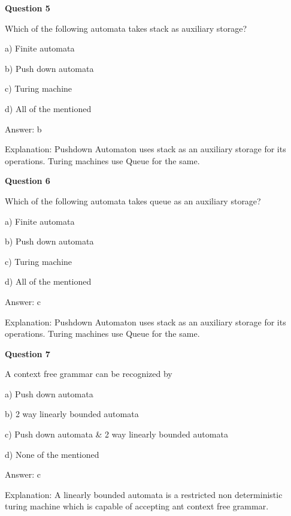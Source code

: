 \documentclass{article}
\begin{document}
\begin{mdframed}[linewidth=1pt, roundcorner=5pt, linecolor=gray!30, backgroundcolor=gray!5]
\textbf{Question 5} 

Which of the following automata takes stack as auxiliary storage?

a) Finite automata

b) Push down automata

c) Turing machine

d) All of the mentioned
\vspace{5pt} \par
\begin{tcolorbox}[colback=green!5, colframe=green!40!black, title=Solution]
Answer: b

Explanation: Pushdown Automaton uses stack as an auxiliary storage for its operations. Turing machines use Queue for the same.
\end{tcolorbox}
\end{mdframed}

\begin{mdframed}[linewidth=1pt, roundcorner=5pt, linecolor=gray!30, backgroundcolor=gray!5]
\textbf{Question 6} 

Which of the following automata takes queue as an auxiliary storage?

a) Finite automata

b) Push down automata

c) Turing machine

d) All of the mentioned
\vspace{5pt} \par
\begin{tcolorbox}[colback=green!5, colframe=green!40!black, title=Solution]
Answer: c

Explanation: Pushdown Automaton uses stack as an auxiliary storage for its operations. Turing machines use Queue for the same.
\end{tcolorbox}
\end{mdframed}
\newpage

\begin{mdframed}[linewidth=1pt, roundcorner=5pt, linecolor=gray!30, backgroundcolor=gray!5]
\textbf{Question 7} 

A context free grammar can be recognized by

a) Push down automata

b) 2 way linearly bounded automata

c) Push down automata \& 2 way linearly bounded automata

d) None of the mentioned
\vspace{5pt} \par
\begin{tcolorbox}[colback=green!5, colframe=green!40!black, title=Solution]
Answer: c

Explanation: A linearly bounded automata is a restricted non deterministic turing machine which is capable of accepting ant context free grammar.
\end{tcolorbox}
\end{mdframed}
\end{document}

